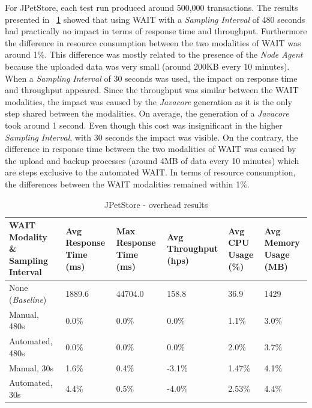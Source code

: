 \documentclass[runningheads,a4paper]{llncs}
\begin{document}
For JPetStore, each test run produced around 500,000 transactions. The results
presented in \tablename ~\ref{PetStore1} showed that using WAIT with a
\emph{Sampling Interval} of 480 seconds had practically no impact in terms of
response time and throughput. Furthermore the difference in resource consumption
between the two modalities of WAIT was around 1\%.  This difference was
mostly related to the presence of the \emph{Node Agent} because the uploaded
data was very small (around 200KB every 10 minutes). When a
\emph{Sampling Interval} of 30 seconds was used, the impact on response time
and throughput appeared. Since the throughput was similar between the WAIT
modalities, the impact was caused by the \emph{Javacore} generation as it is
the only step shared between the modalities. On average, the generation of a
\emph{Javacore} took around 1 second. Even though this cost was insignificant in
the higher \emph{Sampling Interval}, with 30 seconds the impact was visible.
On the contrary, the difference in response time between the two modalities of
WAIT was caused by the upload and backup processes (around 4MB of data every 10
minutes) which are steps exclusive to the automated WAIT.
In terms of resource consumption, the differences between the WAIT modalities
remained within 1\%.

\vspace{-5pt}
\begin{table}[!h]
\caption{JPetStore - overhead results}
\label{PetStore1}
\centering
\begin{tabular}{p{}|p{}|p{}|p{}|p{}|p{}}
\hline
\bfseries WAIT Modality \& Sampling Interval& \bfseries Avg Response Time (ms)&
\bfseries Max Response Time (ms)& \bfseries Avg Throughput (hps)& \bfseries Avg CPU Usage
(\%) & \bfseries Avg Memory Usage (MB)\\
\hline
None (\emph{Baseline}) 	& 1889.6	& 44704.0	& 158.8 	& 36.9 		& 1429\\
Manual, 480s 			& 0.0\% 	& 0.0\%		& 0.0\%		& 1.1\% 	& 3.0\%\\
Automated, 480s 		& 0.0\%		& 0.0\%		& 0.0\% 	& 2.0\% 	& 3.7\%\\
Manual, 30s 			& 1.6\%		& 0.4\%		& -3.1\% 	& 1.47\% 	& 4.1\%\\
Automated, 30s 			& 4.4\%		& 0.5\%		& -4.0\% 	& 2.53\% 	& 4.4\%\\
\hline
\end{tabular}
\end{table}
\vspace{-5pt}
\end{document}
